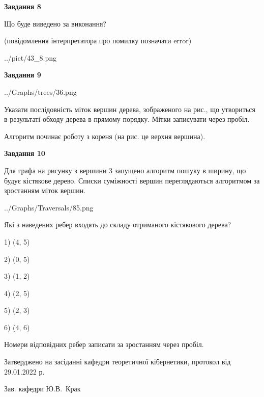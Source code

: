 \documentclass[12pt, ukrainian]{article}
\begin{document}
{\begin {large}
{\begin {center}\textbf{Завдання 8}\end {center}}\par
Що буде виведено за виконання?\par
 (повідомлення інтерпретатора про помилку позначати error)\par
\begin{center}
	{../pict/43_8.png}
\end{center}
\newpage

{\begin {center}\textbf{Завдання 9}\end {center}}\par

\begin{center}
	{../Graphs/trees/36.png}
\end{center}
Указати послідовність міток вершин дерева, зображеного на рис., що утвориться в результаті обходу дерева в прямому порядку. Мітки записувати через пробіл.\par Алгоритм починає роботу з кореня (на рис. це верхня вершина).\par
\newpage

{\begin {center}\textbf{Завдання 10}\end {center}}\par
Для графа на рисунку з вершини 3 запущено алгоритм пошуку в ширину, що будує кістякове дерево. Списки суміжності вершин переглядаються алгоритмом за зростанням міток вершин.\par
\begin{center}
	{../Graphs/Traversals/85.png}
\end{center}
\par Які з наведених ребер входять до складу отриманого кістякового дерева?\par
1) (4, 5)\par
2) (0, 5)\par
3) (1, 2)\par
4) (2, 5)\par
5) (2, 3)\par
6) (4, 6)\par
{\vskip 15pt} Номери відповідних ребер записати за зростанням через пробіл.\par
\newpage


\end {large}
}
{\smallskip \begin {small} Затверджено на засіданні кафедри теоретичної кібернетики, протокол  від   29.01.2022 р.\par\smallskip\smallskip
{\parbox {6.5 cm}{Зав. кафедри \dotfill Ю.В.~Крак}} \end{small}}
\end{document}
